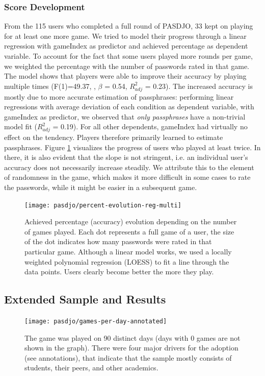 \subsubsection{Score Development}
From the 115 users who completed a full round of PASDJO, 33 kept on playing for at least one more game. We tried to model their progress through a linear regression with gameIndex as predictor and achieved percentage as dependent variable. To account for the fact that some users played more rounds per game, we weighted the percentage with the number of passwords rated in that game. The model shows that players were able to improve their accuracy by playing multiple times (F(1)=49.37, , $\beta$ = 0.54, $R^2_{adj}$ = 0.23). The increased accuracy is mostly due to more accurate estimation of passphrases: performing linear regressions with average deviation of each condition as dependent variable, with gameIndex as predictor, we observed that \textit{only passphrases} have a non-trivial model fit ($R^2_{adj}$ = 0.19). For all other dependents, gameIndex had virtually no effect on the tendency. Players therefore primarily learned to estimate passphrases. Figure \ref{fig:pasdjo:percent-evolution} visualizes the progress of users who played at least twice. In there, it is also evident that the slope is not stringent, i.e. an individual user's accuracy does not necessarily increase steadily. We attribute this to the element of randomness in the game, which makes it more difficult in some cases to rate the passwords, while it might be easier in a subsequent game. 

\begin{figure}
	\centering
	\texttt{[image: pasdjo/percent-evolution-reg-multi]}
	\caption{\label{fig:pasdjo:percent-evolution} Achieved percentage (accuracy) evolution depending on the number of games played. Each dot represents a full game of a user, the size of the dot indicates how many passwords were rated in that particular game. Although a linear model works, we used a locally weighted polynomial regression (LOESS) to fit a line through the data points. Users clearly become better the more they play.}
\end{figure}


\subsection{Extended Sample and Results}
\begin{figure}
	\centering
	\texttt{[image: pasdjo/games-per-day-annotated]}
	\caption{\label{fig:pasdjo:games-1y} The game was played on 90 distinct days (days with 0 games are not shown in the graph). There were four major drivers for the adoption (see annotations), that indicate that the sample mostly consists of students, their peers, and other academics.}
\end{figure}

